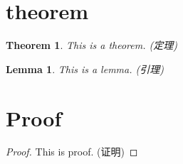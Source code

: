 \documentclass{article}
\newtheorem{theorem}{Theorem} %
\newtheorem{lemma}{Lemma} %
\newtheorem{proof}{Proof}[section] %
\begin{document}
    \section{theorem}

    \begin{theorem}
        This is a theorem. (定理)
    \end{theorem}

    \begin{lemma}
        This is a lemma. (引理)
    \end{lemma}

    \section{Proof}

    \begin{proof}
        This is proof. (证明)
    \end{proof}
\end{document}
